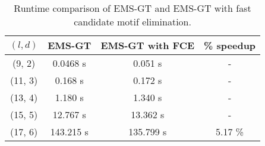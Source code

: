 \begin{table}[h] %
	\renewcommand{\arraystretch}{1.3}
	\centering
	\begin{tabular}{|c|c|c|c|}
	\hline 
	\bfseries\boldmath $(l,d)$ & 
	\bfseries\boldmath EMS-GT & 
	\bfseries\boldmath EMS-GT with FCE & 
	\bfseries \% speedup\\
	\hline
	(9, 2) & 0.0468 s &		0.051 s 	&	-\\
	(11, 3) & 0.168 s &		0.172 s 	&	-\\
	(13, 4) & 1.180 s &		1.340 s 	&	-\\
	(15, 5) & 12.767 s &	13.362 s  	&	-\\
	(17, 6) & 143.215 s &	135.799 s 	&	5.17 \%\\
	\hline\end{tabular}
	
	\caption{Runtime comparison of EMS-GT and EMS-GT with fast candidate motif elimination.}
	\label{tbl:ems-gt-fce-speedup}
\end{table}



